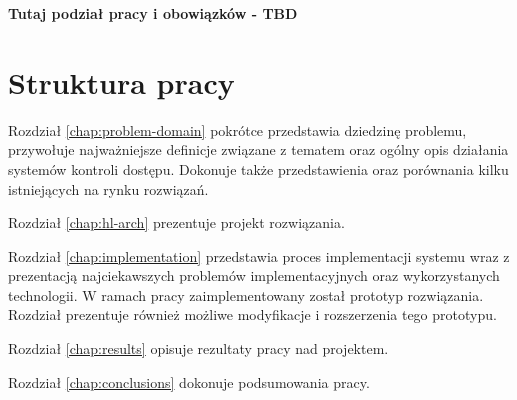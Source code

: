 
		\textbf{Tutaj podział pracy i obowiązków - TBD}

	\section{Struktura pracy}

		Rozdział \ref{chap:problem-domain} pokrótce przedstawia dziedzinę problemu, przywołuje najważniejsze definicje związane z tematem oraz ogólny opis działania systemów kontroli dostępu. Dokonuje także przedstawienia oraz porównania kilku istniejących na rynku rozwiązań.

		Rozdział \ref{chap:hl-arch} prezentuje projekt rozwiązania.

		Rozdział \ref{chap:implementation} przedstawia proces implementacji systemu wraz z prezentacją najciekawszych problemów implementacyjnych oraz wykorzystanych technologii. W ramach pracy zaimplementowany został prototyp rozwiązania. Rozdział prezentuje również możliwe modyfikacje i rozszerzenia tego prototypu.

		Rozdział \ref{chap:results} opisuje rezultaty pracy nad projektem.

		Rozdział \ref{chap:conclusions} dokonuje podsumowania pracy.